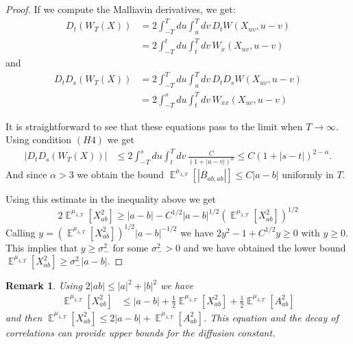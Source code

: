 \documentclass[a4paper,12pt,reqno]{amsart}
\newtheorem{remark}[theorem]{Remark}
\DeclareMathOperator{\expect}{{\mathbb E}}
\begin{document}
\begin{proof}
If we compute the Malliavin derivatives, we get:
\begin{equation}
  \begin{split}
  D_{t} (W_T(X)) & = 2 \int_{-T}^T du \int_{u}^T dv \, D_t 
  W(X_{uv},u-v)    
\\ & = 2 \int_{-T}^{t} du \int_{t}^{T} dv \,
  W_{x}(X_{uv},u-v)    
  \end{split}
\end{equation}
and
\begin{equation}
  \begin{split}
  D_{t} D_{s}(W_T(X)) & = 2 \int_{-T}^T du \int_{u}^T dv \, D_t D_s
  W(X_{uv},u-v)    
\\ & = 2 \int_{-T}^{s} du \int_{t}^{T} dv \,
  W_{xx}(X_{uv},u-v)    
  \end{split}
\end{equation}

It is straightforward to see that these equations pass to the limit
when $T \to \infty$.
Using condition $(H4)$ we get
\begin{equation}
  \begin{split}
|  D_{t} D_{s}(W_T(X))| & \le
 2 \int_{-T}^{s} du \int_{t}^{T} dv \, \frac{C}{(1+|u-v|)^{\alpha}}
 \le
 C (1+|s-t|)^{2-\alpha}.
   \end{split}
\end{equation}
And since $\alpha > 3$ we obtain the bound
$
 \expect^{\mu_{\lambda,T}} [ |B_{ab,ab}|] \le C |a-b|
$
uniformly in $T$.

Using this estimate in the inequality above we get
\begin{equation*}
 2 \expect^{\mu_{\lambda,T}} [X_{ab}^2 ] \ge 
|a-b| - C^{1/2}|a-b|^{1/2} 
\left(\expect^{\mu_{\lambda,T}}[ X_{ab}^2]\right)^{1/2} 
\end{equation*}
Calling $y = \left(\expect^{\mu_{\lambda,T}}[ X_{ab}^2]\right)^{1/2} |a-b|^{-1/2}$ we have
$
 2 y^2 -1 + C^{1/2}y \ge 0
$
with $y \ge 0$. This implies that $y \ge \sigma^2_-$ for some $\sigma^2_-> 0$ and we have obtained the lower bound
$
\expect^{\mu_{\lambda,T}} [X_{ab}^2 ] \ge \sigma^2_- |a-b|
$.
\end{proof}



\begin{remark}
Using
$
2|ab| \le |a|^2+|b|^2
$
we have
\begin{equation*}
  \begin{split}
\expect^{\mu_{\lambda,T}} [X_{ab}^2] & \le  |a-b| + \frac{1}{2}
 \expect^{\mu_{\lambda,T}} [X_{ab}^2]      
 + \frac{1}{2} \expect^{\mu_{\lambda,T}} \left[A_{ab}^2 \right]      
  \end{split}
\end{equation*}
and then
$\expect^{\mu_{\lambda,T}} [X_{ab}^2]  \le  2 |a-b| + \expect^{\mu_{\lambda,T}} \left[A_{ab}^2\right]      
$.
This equation and the decay of correlations can provide upper bounds for the diffusion constant.  
\end{remark}
\end{document}
